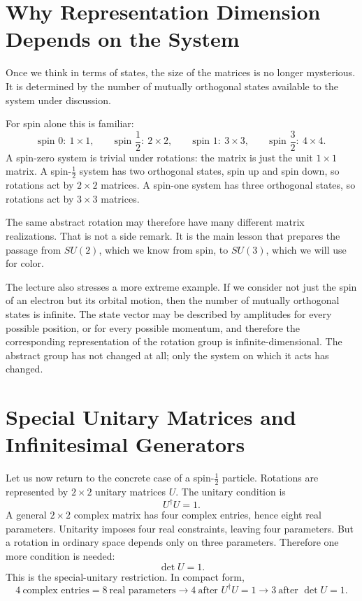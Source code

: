 \section{Why Representation Dimension Depends on the System}

Once we think in terms of states, the size of the matrices is no longer mysterious. It is determined by the number of mutually orthogonal states available to the system under discussion.

For spin alone this is familiar:
\begin{equation}
\text{spin }0:\ 1\times1,\qquad
\text{spin }\frac12:\ 2\times2,\qquad
\text{spin }1:\ 3\times3,\qquad
\text{spin }\frac32:\ 4\times4.
\end{equation}
A spin-zero system is trivial under rotations: the matrix is just the unit \(1\times1\) matrix. A spin-\(\frac12\) system has two orthogonal states, spin up and spin down, so rotations act by \(2\times2\) matrices. A spin-one system has three orthogonal states, so rotations act by \(3\times3\) matrices.

The same abstract rotation may therefore have many different matrix realizations. That is not a side remark. It is the main lesson that prepares the passage from \(SU(2)\), which we know from spin, to \(SU(3)\), which we will use for color.

The lecture also stresses a more extreme example. If we consider not just the spin of an electron but its orbital motion, then the number of mutually orthogonal states is infinite. The state vector may be described by amplitudes for every possible position, or for every possible momentum, and therefore the corresponding representation of the rotation group is infinite-dimensional. The abstract group has not changed at all; only the system on which it acts has changed.

\section{Special Unitary Matrices and Infinitesimal Generators}

Let us now return to the concrete case of a spin-\(\frac12\) particle. Rotations are represented by \(2\times2\) unitary matrices \(U\). The unitary condition is
\begin{equation}
U^\dagger U = 1.
\end{equation}
A general \(2\times2\) complex matrix has four complex entries, hence eight real parameters. Unitarity imposes four real constraints, leaving four parameters. But a rotation in ordinary space depends only on three parameters. Therefore one more condition is needed:
\begin{equation}
\det U = 1.
\end{equation}
This is the special-unitary restriction. In compact form,
\begin{equation}
4\ \text{complex entries} = 8\ \text{real parameters}
\longrightarrow
4\ \text{after }U^\dagger U=1
\longrightarrow
3\ \text{after }\det U=1.
\end{equation}

